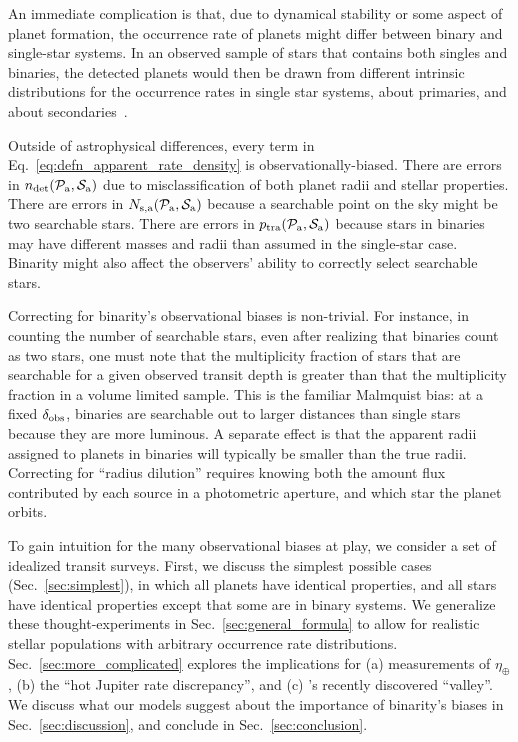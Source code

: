 \documentclass[12pt,modern]{aastex61}
\newcommand{\pp}{\mathcal{P}}
\newcommand{\ps}{\mathcal{S}}
\renewcommand{\a}{_{\rm a}}
\begin{document}
An immediate complication is that, due to dynamical stability or some 
aspect of planet formation, the occurrence rate of planets might differ 
between binary and single-star systems.
In an observed sample of stars that contains both singles and binaries, the 
detected planets would then be drawn from different intrinsic 
distributions for the occurrence rates in single star systems, 
about primaries, and about secondaries~\citep[{\it 
e.g.},][]{wang_occurrence_2015}.

Outside of astrophysical differences, every term in 
Eq.~\ref{eq:defn_apparent_rate_density} is observationally-biased.
There are errors in $n_{\rm det}(\pp\a,\ps\a)$ due to misclassification of 
both planet radii and stellar properties.
There are errors in $N_{{\rm s,a}}(\pp\a,\ps\a)$ because a 
searchable point on the sky might be two searchable stars.
There are errors in $p_{\rm tra}(\pp\a,\ps\a)$ because stars in binaries may 
have different masses and radii than assumed in the single-star case.
Binarity might also affect the observers' ability to correctly select 
searchable stars.

Correcting for binarity's observational biases is non-trivial.
For instance, in counting the number of searchable stars, even after realizing 
that binaries count as two stars, one must note that the multiplicity fraction 
of stars that are searchable for a given observed transit depth is greater 
than that the multiplicity fraction in a volume limited sample.
This is the familiar Malmquist bias: at a fixed $\delta_{\rm obs}$, binaries 
are searchable out to larger distances than single stars because they are more 
luminous.
A separate effect is that the apparent radii assigned to planets in binaries 
will typically be smaller than the true radii.
Correcting for ``radius dilution'' requires knowing both the amount flux 
contributed by each source in a photometric aperture, and which star the 
planet orbits.


To gain intuition for the many observational biases at play,
we consider a set of idealized transit surveys.
First, we discuss the simplest possible cases (Sec.~\ref{sec:simplest}), in 
which all planets have identical properties, and all stars have identical 
properties except that some are in binary systems.
We generalize these thought-experiments in 
Sec.~\ref{sec:general_formula} to allow for realistic stellar populations with 
arbitrary occurrence rate distributions.
Sec.~\ref{sec:more_complicated} explores the implications for
(a) measurements of $\eta_\oplus$,
(b) the ``hot Jupiter rate discrepancy'', and 
(c) \citet{fulton_california-_2017}'s recently discovered ``valley''.
We discuss what our models suggest about the importance of binarity's biases 
in Sec.~\ref{sec:discussion}, and conclude in Sec.~\ref{sec:conclusion}.
\end{document}
